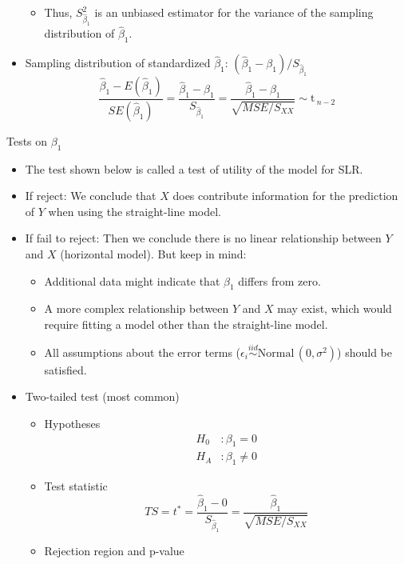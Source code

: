 \documentclass{article}
\newcommand{\followsp}[2]{\overset{#1}\sim \text{#2}\,}		%
\begin{document}
\begin{itemize}
\begin{itemize}
         \item Thus, $S^2_{\hat{\beta}_1}$ is an unbiased estimator for the variance of the sampling distribution of $\hat{\beta}_1$.
     \end{itemize}
     \item Sampling distribution of standardized $\hat{\beta}_1$: $(\hat{\beta}_1 - \beta_1) / S_{\hat{\beta}_1}$
     \[
      \frac{\hat{\beta}_1 - E(\hat{\beta}_1)}{SE(\hat{\beta}_1)} = \frac{\hat{\beta}_1 - \beta_1}{S_{\hat{\beta}_1}} = \frac{\hat{\beta}_1 - \beta_1}{\sqrt{MSE / S_{XX}}} \sim \text{t}\,_{n - 2}
     \]
\end{itemize}

\newpage

Tests on $\beta_1$\bigskip
\begin{itemize}
    \item The test shown below is called a test of utility of the model for SLR.
    \item If reject: We conclude that $X$ does contribute information for the prediction of $Y$ when using the straight-line model.
    \item[] If fail to reject: Then we conclude there is no linear relationship between $Y$ and $X$ (horizontal model). But keep in mind:
    \begin{itemize}
        \item Additional data might indicate that $\beta_1$ differs from zero.
        \item A more complex relationship between $Y$ and $X$ may exist, which would require fitting a model other than the straight-line model.
        \item All assumptions about the error terms ($\epsilon_i \followsp{iid}{Normal}(0,\sigma^2)$) should be satisfied.
    \end{itemize}
    \item Two-tailed test (most common)
    \begin{itemize}
        \item Hypotheses
        \begin{align*}
          H_0 &: \beta_1 = 0 \\
          H_A &: \beta_1 \ne 0
        \end{align*}
        \item Test statistic
        \[
        TS = t^* = \frac{\hat{\beta}_1 - 0}{S_{\hat{\beta}_1}} = \frac{\hat{\beta}_1}{\sqrt{MSE / S_{XX}}}
        \]
        \item Rejection region and p-value
        \begin{align*}

\end{align*}
\end{itemize}
\end{itemize}
\end{document}
